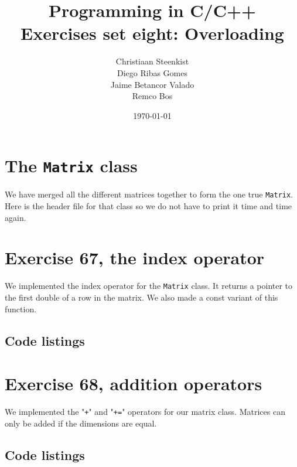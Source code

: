 \documentclass[11pt]{article}
\begin{document}
\title{Programming in C/C++ \\
       Exercises set eight: Overloading
}
\date{\today}
\author{Christiaan Steenkist \\
Diego Ribas Gomes \\
Jaime Betancor Valado \\
Remco Bos \\
}

\maketitle

\section*{The \texttt{Matrix} class}
We have merged all the different matrices together to form the one true \texttt{Matrix}.
Here is the header file for that class so we do not have to print it time and time again.



\section*{Exercise 67, the index operator}
We implemented the index operator for the \texttt{Matrix} class.
It returns a pointer to the first double of a row in the matrix.
We also made a const variant of this function.

\subsection*{Code listings}

\section*{Exercise 68, addition operators}
We implemented the "\texttt{+}" and "\texttt{+=}" operators for our matrix class.
Matrices can only be added if the dimensions are equal.

\subsection*{Code listings}


\end{document}
